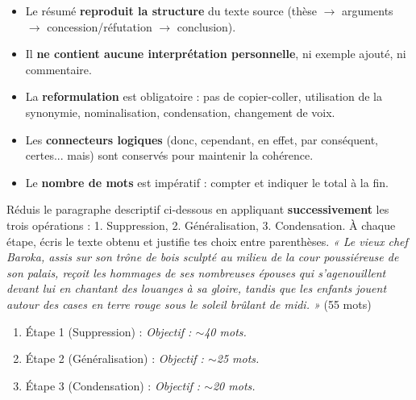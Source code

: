 \documentclass[11pt]{article}
\newcounter{popsec}
\newcounter{popsub}
\newcommand{\courssub}[1]{%
  \stepcounter{popsub}%
  \par\vspace{9pt}\noindent{\popxbold\fontsize{11.5}{13}\selectfont\color{popink}{\color{poporange}\thepopsec.\thepopsub}\hspace{6pt}#1}\par\nopagebreak\vspace{4pt}
}
\begin{document}
\begin{aretenir}
\begin{itemize}
    \item Le résumé \textbf{reproduit la structure} du texte source (thèse $\rightarrow$ arguments $\rightarrow$ concession/réfutation $\rightarrow$ conclusion).
    \item Il \textbf{ne contient aucune interprétation personnelle}, ni exemple ajouté, ni commentaire.
    \item La \textbf{reformulation} est obligatoire : pas de copier-coller, utilisation de la synonymie, nominalisation, condensation, changement de voix.
    \item Les \textbf{connecteurs logiques} (donc, cependant, en effet, par conséquent, certes... mais) sont conservés pour maintenir la cohérence.
    \item Le \textbf{nombre de mots} est impératif : compter et indiquer le total à la fin.
\end{itemize}
\end{aretenir}

\courssub{Je m'entraîne}

\begin{exercice}
Réduis le paragraphe descriptif ci-dessous en appliquant \textbf{successivement} les trois opérations : 1. Suppression, 2. Généralisation, 3. Condensation. À chaque étape, écris le texte obtenu et justifie tes choix entre parenthèses.
\emph{« Le vieux chef Baroka, assis sur son trône de bois sculpté au milieu de la cour poussiéreuse de son palais, reçoit les hommages de ses nombreuses épouses qui s'agenouillent devant lui en chantant des louanges à sa gloire, tandis que les enfants jouent autour des cases en terre rouge sous le soleil brûlant de midi. »} (55 mots)
\begin{enumerate}
    \item Étape 1 (Suppression) : \textit{Objectif : $\sim$40 mots.}
    \item Étape 2 (Généralisation) : \textit{Objectif : $\sim$25 mots.}
    \item Étape 3 (Condensation) : \textit{Objectif : $\sim$20 mots.}
\end{enumerate}
\end{exercice}
\end{document}
